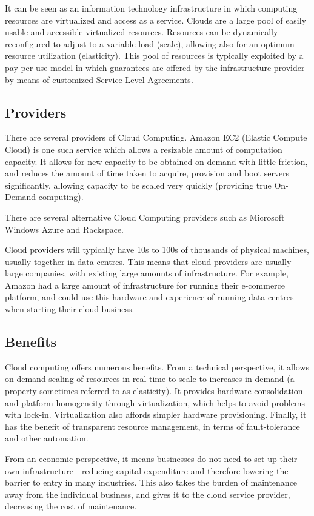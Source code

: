\documentclass{article}
\begin{document}
It can be seen as an information technology infrastructure in which computing resources are virtualized and access as a service. Clouds are a large pool of easily usable and accessible virtualized resources. Resources can be dynamically reconfigured to adjust to a variable load (scale), allowing also for an optimum resource utilization (elasticity). This pool of resources is typically exploited by a pay-per-use model in which guarantees are offered by the infrastructure provider by means of customized Service Level Agreements.

\subsection{Providers}
There are several providers of Cloud Computing. Amazon EC2 (Elastic Compute Cloud) is one such service which allows a resizable amount of computation capacity. It allows for new capacity to be obtained on demand with little friction, and reduces the amount of time taken to acquire, provision and boot servers significantly, allowing capacity to be scaled very quickly (providing true On-Demand computing). 

There are several alternative Cloud Computing providers such as Microsoft Windows Azure and Rackspace. 

Cloud providers will typically have 10s to 100s of thousands of physical machines, usually together in data centres. This means that cloud providers are usually large companies, with existing large amounts of infrastructure. For example, Amazon had a large amount of infrastructure for running their e-commerce platform, and could use this hardware and experience of running data centres when starting their cloud business.

\subsection{Benefits}
Cloud computing offers numerous benefits. From a technical perspective, it allows on-demand scaling of resources in real-time to scale to increases in demand (a property sometimes referred to as elasticity). It provides hardware consolidation and platform homogeneity through virtualization, which helps to avoid problems with lock-in. Virtualization also affords simpler hardware provisioning. Finally, it has the benefit of transparent resource management, in terms of fault-tolerance and other automation.

From an economic perspective, it means businesses do not need to set up their own infrastructure - reducing capital expenditure and therefore lowering the barrier to entry in many industries. This also takes the burden of maintenance away from the individual business, and gives it to the cloud service provider, decreasing the cost of maintenance. 
\end{document}
